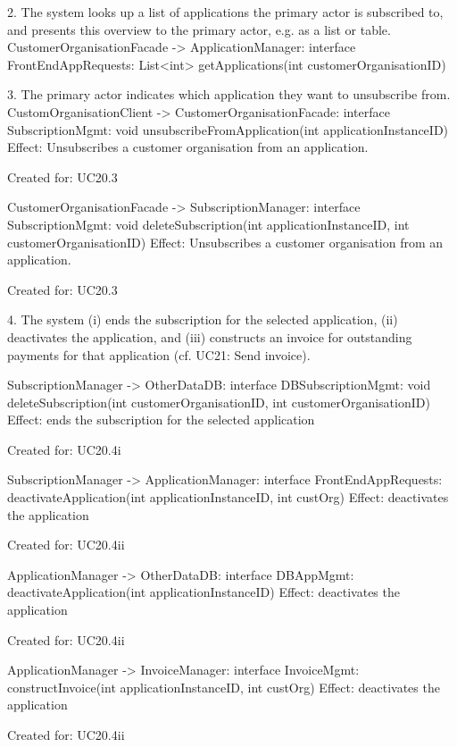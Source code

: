 {{{{{{{{{{{{{{        2. The system looks up a list of applications the primary actor is subscribed to, and presents this
            overview to the primary actor, e.g. as a list or table.
            CustomerOrganisationFacade -> ApplicationManager: interface FrontEndAppRequests: List<int> getApplications(int customerOrganisationID)

        3. The primary actor indicates which application they want to unsubscribe from.
             CustomOrganisationClient -> CustomerOrganisationFacade: interface SubscriptionMgmt: void  unsubscribeFromApplication(int applicationInstanceID)
                 Effect: Unsubscribes a customer organisation from an application.
                 \item Created for: UC20.3

             CustomerOrganisationFacade -> SubscriptionManager: interface SubscriptionMgmt: void  deleteSubscription(int applicationInstanceID, int customerOrganisationID)
                 Effect: Unsubscribes a customer organisation from an application.
                 \item Created for: UC20.3

        4. The system (i) ends the subscription for the selected application,
           (ii) deactivates the application, and
           (iii) constructs an invoice for outstanding payments for that application (cf. UC21: Send invoice).

            SubscriptionManager -> OtherDataDB: interface DBSubscriptionMgmt: void deleteSubscription(int customerOrganisationID, int customerOrganisationID)
                Effect: ends the subscription for the selected application
                \item Created for: UC20.4i

            SubscriptionManager -> ApplicationManager: interface FrontEndAppRequests: deactivateApplication(int applicationInstanceID, int custOrg)
                Effect: deactivates the application
                \item Created for: UC20.4ii

            ApplicationManager -> OtherDataDB: interface DBAppMgmt: deactivateApplication(int applicationInstanceID)
                Effect: deactivates the application
                \item Created for: UC20.4ii

            ApplicationManager -> InvoiceManager: interface InvoiceMgmt: constructInvoice(int applicationInstanceID, int custOrg)
                Effect: deactivates the application
                \item Created for: UC20.4ii

}}}}}}}}}}}}}}
